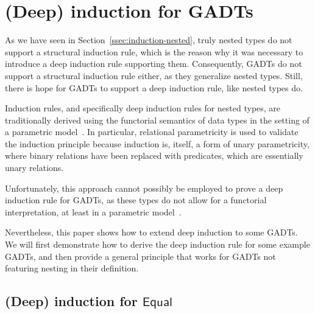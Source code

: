 \documentclass[acmsmall,screen,review,anonymous]{acmart}
\theoremstyle{definition}
\begin{document}
\section{(Deep) induction for GADTs}


As we have seen in Section~\ref{ssec:induction-nested},
truly nested types do not support a structural induction rule,
which is the reason why it was necessary to introduce a deep induction rule supporting them.
Consequently, GADTs do not support a structural induction rule either,
as they generalize nested types.
Still, there is hope for GADTs to support a deep induction rule,
like nested types do.

Induction rules, and specifically deep induction rules for nested types,
are traditionally derived using the functorial semantics of data types
in the setting of a parametric model~\cite{jp19}.
In particular, relational parametricity is used to validate the induction principle because induction is, itself,
a form of unary parametricity, where binary relations have been replaced with predicates,
which are essentially unary relations.

Unfortunately, this approach cannot possibly be employed
to prove a deep induction rule for GADTs,
as these types do not allow for a functorial interpretation,
at least in a parametric model~\cite{Haskell-paper}.

Nevertheless, this paper shows how to extend deep induction to some GADTs.
We will first demonstrate how to derive the deep induction rule for some example GADTs,
and then provide a general principle that works for GADTs not featuring nesting in their definition.



\subsection{(Deep) induction for $\mathsf{Equal}$}\label{sec:ind-equal}
\end{document}
